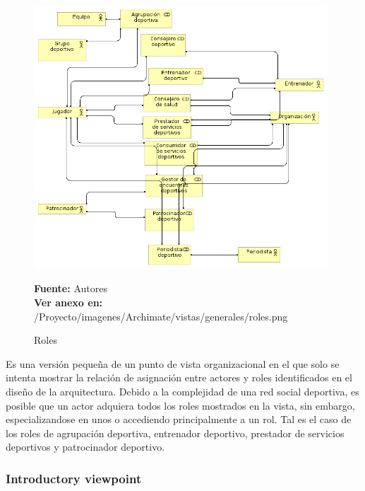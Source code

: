 \begin{figure}[!htb]
  \begin{center}
    \includegraphics[width=11cm]{./imagenes/Archimate/vistas/generales/roles.png}
    \caption{Roles}
    \label{fig:Roles}
    \textbf{Fuente:}  Autores \\
    \textbf{Ver anexo en:} /Proyecto/imagenes/Archimate/vistas/generales/roles.png
  \end{center}
\end{figure}

Es una versión pequeña de un punto de vista organizacional en el que solo se intenta mostrar la relación de asignación entre actores y roles identificados en el diseño de la arquitectura. Debido a la complejidad de una red social deportiva, es posible que un actor adquiera todos los roles mostrados en la vista, sin embargo, especializandose en unos o accediendo principalmente a un rol. Tal es el caso de los roles de agrupación deportiva, entrenador deportivo, prestador de servicios deportivos y patrocinador deportivo.

\subsubsection{Introductory viewpoint}

